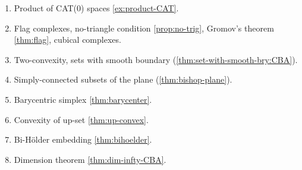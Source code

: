 \begin{enumerate}
\item Product of CAT(0) spaces \ref{ex:product-CAT}.
\item Flag complexes, no-triangle condition \ref{prop:no-trig}, Gromov's theorem \ref{thm:flag}, cubical complexes.
\item Two-convexity, sets with smooth boundary (\ref{thm:set-with-smooth-bry:CBA}).
\item Simply-connected subsets of the plane (\ref{thm:bishop-plane}).
\item Barycentric simplex \ref{thm:barycenter}.
\item Convexity of up-set \ref{thm:up-convex}.
\item Bi-H\"older embedding \ref{thm:bihoelder}.
\item Dimension theorem \ref{thm:dim-infty-CBA}.
\end{enumerate}

